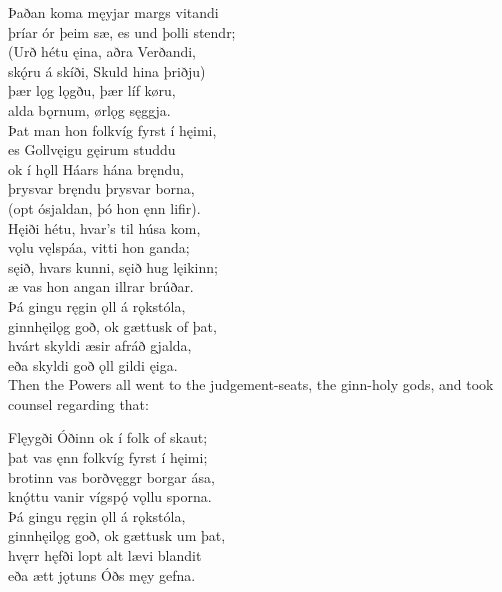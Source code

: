 \bva Þaðan koma męyjar \hld margs vitandi \\%
þríar ór þeim sæ, \hld es und þolli stendr; \\%
(Urð hétu ęina, \hld aðra Verðandi, \\%
skǫ́ru á skíði, \hld Skuld hina þriðju) \\%
þær lǫg lǫgðu, \hld þær líf køru, \\%
alda bǫrnum, \hld ørlǫg sęggja.\\%

\bva Þat man hon folkvíg \hld fyrst í hęimi, \\%
es Gollvęigu \hld gęirum studdu \\%
ok í hǫll Háars \hld hána bręndu, \\%
þrysvar bręndu \hld þrysvar borna, \\%
(opt ósjaldan, \hld þó hon ęnn lifir).\\%

\bva Hęiði hétu, \hld hvar's til húsa kom, \\%
vǫlu vęlspáa, \hld vitti hon ganda; \\%
sęið, hvars kunni, \hld sęið hug lęikinn; \\%
æ vas hon angan \hld illrar brúðar.\\%

\bva Þá gingu ręgin ǫll \hld á rǫkstóla, \\%
ginnhęilǫg goð, \hld ok gættusk of þat, \\%
hvárt skyldi æsir \hld afráð gjalda, \\%
eða skyldi goð ǫll \hld gildi ęiga.\\%

\bvb Then the Powers all went to the judgement-seats, the ginn-holy gods, and took counsel regarding that:

\bva Flęygði Óðinn \hld ok í folk of skaut; \\%
þat vas ęnn folkvíg \hld fyrst í hęimi; \\%
brotinn vas borðvęggr \hld borgar ása, \\%
knǫ́ttu vanir vígspǫ́ \hld vǫllu sporna.\\%

\bva Þá gingu ręgin ǫll \hld á rǫkstóla, \\%
ginnhęilǫg goð, \hld ok gættusk um þat, \\%
hvęrr hęfði lopt alt \hld lævi blandit \\%
eða ætt jǫtuns \hld Óðs męy gefna.\\%

